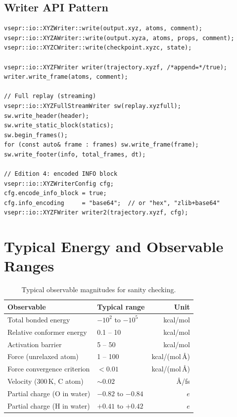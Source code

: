 \documentclass[12pt, a4paper, oneside]{article}
\begin{document}
\subsection{Writer API Pattern}

\begin{lstlisting}
vsepr::io::XYZWriter::write(output.xyz, atoms, comment);
vsepr::io::XYZAWriter::write(output.xyza, atoms, props, comment);
vsepr::io::XYZCWriter::write(checkpoint.xyzc, state);

vsepr::io::XYZFWriter writer(trajectory.xyzf, /*append=*/true);
writer.write_frame(atoms, comment);

// Full replay (streaming)
vsepr::io::XYZFullStreamWriter sw(replay.xyzfull);
sw.write_header(header);
sw.write_static_block(statics);
sw.begin_frames();
for (const auto& frame : frames) sw.write_frame(frame);
sw.write_footer(info, total_frames, dt);

// Edition 4: encoded INFO block
vsepr::io::XYZWriterConfig cfg;
cfg.encode_info_block = true;
cfg.info_encoding     = "base64";  // or "hex", "zlib+base64"
vsepr::io::XYZFWriter writer2(trajectory.xyzf, cfg);
\end{lstlisting}

\section{Typical Energy and Observable Ranges}
\label{sec:ranges}

\begin{table}[htbp]
  \centering
  \caption{Typical observable magnitudes for sanity checking.}
  \label{tab:ranges}
  \begin{tabular}{llr}
    \toprule
    Observable & Typical range & Unit \\
    \midrule
    Total bonded energy          & $-10^2$ to $-10^5$   & kcal/mol \\
    Relative conformer energy    & 0.1 -- 10            & kcal/mol \\
    Activation barrier           & 5 -- 50              & kcal/mol \\
    Force (unrelaxed atom)       & 1 -- 100             & kcal/(mol\,\AA) \\
    Force convergence criterion  & $< 0.01$             & kcal/(mol\,\AA) \\
    Velocity (300\,K, C atom)    & $\sim 0.02$          & \AA/fs \\
    Partial charge (O in water)  & $-0.82$ to $-0.84$   & $e$ \\
    Partial charge (H in water)  & $+0.41$ to $+0.42$   & $e$ \\
    \bottomrule
  \end{tabular}
\end{table}
\end{document}
